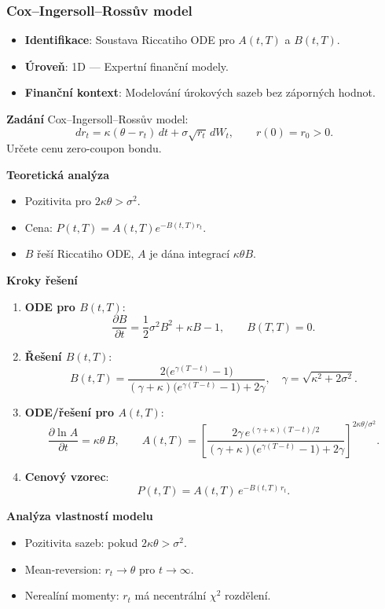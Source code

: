 \subsubsection{Cox–Ingersoll–Rossův model}
\label{subsec:cir-model}

\begin{example}
\label{ex:cir-model}

\begin{itemize}
\item \textbf{Identifikace}: Soustava Riccatiho ODE pro $A(t,T)$ a $B(t,T)$.
\item \textbf{Úroveň}: 1D — Expertní finanční modely.
\item \textbf{Finanční kontext}: Modelování úrokových sazeb bez záporných hodnot.
\end{itemize}

\noindent\textbf{Zadání}
Cox–Ingersoll–Rossův model:
\[
dr_t = \kappa(\theta - r_t)\, dt + \sigma\sqrt{r_t}\, dW_t, \qquad r(0)=r_0>0.
\]
Určete cenu zero-coupon bondu.

\noindent\textbf{Teoretická analýza}
\begin{itemize}
\item Pozitivita pro $2\kappa\theta > \sigma^2$.
\item Cena: $P(t,T)=A(t,T)e^{-B(t,T)r_t}$.
\item $B$ řeší Riccatiho ODE, $A$ je dána integrací $\kappa\theta B$.
\end{itemize}

\noindent\textbf{Kroky řešení}
\begin{enumerate}
\item \textbf{ODE pro $B(t,T)$}:
\[
\frac{\partial B}{\partial t} = \frac{1}{2}\sigma^2 B^2 + \kappa B - 1, \qquad B(T,T)=0.
\]
\item \textbf{Řešení $B(t,T)$}:
\[
B(t,T) = \frac{2\big(e^{\gamma (T-t)} - 1\big)}{(\gamma + \kappa)\big(e^{\gamma (T-t)} - 1\big) + 2\gamma},
\quad \gamma = \sqrt{\kappa^2 + 2\sigma^2}.
\]
\item \textbf{ODE/řešení pro $A(t,T)$}:
\[
\frac{\partial \ln A}{\partial t} = \kappa\theta\, B, \qquad
A(t,T) = \left[\frac{2\gamma\, e^{(\gamma+\kappa)(T-t)/2}}{(\gamma + \kappa)\big(e^{\gamma (T-t)} - 1\big) + 2\gamma}\right]^{\!\!2\kappa\theta/\sigma^2}.
\]
\item \textbf{Cenový vzorec}:
\[
P(t,T) = A(t,T)\, e^{-B(t,T)\, r_t}.
\]
\end{enumerate}

\noindent\textbf{Analýza vlastností modelu}
\begin{itemize}
\item Pozitivita sazeb: pokud $2\kappa\theta > \sigma^2$.
\item Mean-reversion: $r_t \to \theta$ pro $t\to\infty$.
\item Nerealíní momenty: $r_t$ má necentrální $\chi^2$ rozdělení.
\end{itemize}


\end{example}
